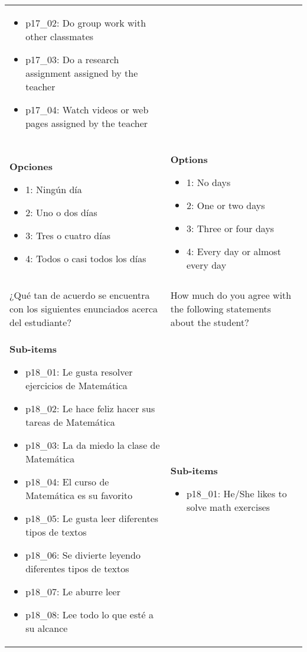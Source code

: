 \documentclass[11pt]{article}
\begin{document}
\begin{longtable}{@{}LL@{}}
\begin{itemize}[leftmargin=*]
\item p17\_02: Do group work with other classmates
\item p17\_03: Do a research assignment assigned by the teacher
\item p17\_04: Watch videos or web pages assigned by the teacher\end{itemize} \\
\textbf{Opciones}\par\begin{itemize}[leftmargin=*]\item 1: Ningún día
\item 2: Uno o dos días
\item 3: Tres o cuatro días
\item 4: Todos o casi todos los días\end{itemize} & \textbf{Options}\par\begin{itemize}[leftmargin=*]\item 1: No days
\item 2: One or two days
\item 3: Three or four days
\item 4: Every day or almost every day\end{itemize} \\
\addlinespace[4pt]
 \\ 
¿Qué tan de acuerdo se encuentra con los siguientes enunciados acerca del estudiante? & How much do you agree with the following statements about the student? \\
\textbf{Sub-items}\par\begin{itemize}[leftmargin=*]\item p18\_01: Le gusta resolver ejercicios de Matemática
\item p18\_02: Le hace feliz hacer sus tareas de Matemática
\item p18\_03: La da miedo la clase de Matemática
\item p18\_04: El curso de Matemática es su favorito
\item p18\_05: Le gusta leer diferentes tipos de textos
\item p18\_06: Se divierte leyendo diferentes tipos de textos
\item p18\_07: Le aburre leer
\item p18\_08: Lee todo lo que esté a su alcance\end{itemize} & \textbf{Sub-items}\par\begin{itemize}[leftmargin=*]\item p18\_01: He/She likes to solve math exercises

\end{itemize}
\end{longtable}
\end{document}
